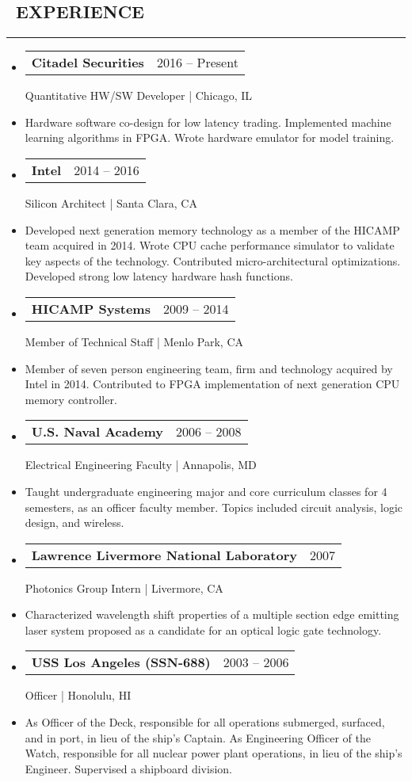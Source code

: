 \documentclass[10pt,letterpaper]{article}
\makeatletter
\newenvironment{resumesection}[1]
{%
    \subsection*{\ \textcolor{light-gray}{#1} }
    \vspace{-0.4em}
    \begin{samepage}
    \hrule
    \end{samepage}
    \vspace{+0.4em}
    \begin{itemize}[leftmargin=0.15cm]
        \parskip=0.1em
}%
{%
    \end{itemize}
}%
\newcommand{\myitem}[1] {
    \item[] \textcolor{dark-gray}{#1}
}
\newcommand{\headertri}[3] {
    \item[] \begin{tabular*}{\linewidth}{l@{\extracolsep{\fill}}r}
    \textbf{#1} & #2 \\
    \end{tabular*}
    #3
}
\newcommand{\cminiw}{0.075}
\newcommand{\rminiw}{0.550}
\makeatother
\begin{document}
\begin{minipage}[t]{\cminiw\textwidth}
\end{minipage}\hfill
\begin{minipage}[t]{\rminiw\textwidth}
\begin{resumesection}{EXPERIENCE}
    \headertri
    {Citadel Securities}
    {2016 -- Present}
    {Quantitative HW/SW Developer | Chicago, IL}
    \myitem{
        Hardware software co-design for low latency trading.
        Implemented machine learning algorithms in FPGA.
        Wrote hardware emulator for model training.
    }

    \headertri
    {Intel}
    {2014 -- 2016}
    {Silicon Architect | Santa Clara, CA}
    \myitem{
        Developed next generation memory technology as a member of the HICAMP team acquired in 2014.
        Wrote CPU cache performance simulator to validate key aspects of the technology.
        Contributed micro-architectural optimizations.
        Developed strong low latency hardware hash functions.
    }


    \headertri
    {HICAMP Systems}
    {2009 -- 2014}
    {Member of Technical Staff | Menlo Park, CA}
    \myitem{
        Member of seven person engineering team, firm and technology acquired by Intel in 2014.
        Contributed to FPGA implementation of next generation CPU memory controller.
    }

    \headertri
    {U.S. Naval Academy}
    {2006 -- 2008}
    {Electrical Engineering Faculty | Annapolis, MD}
    \myitem{
        Taught undergraduate engineering major and core curriculum classes for 4 semesters,
        as an officer faculty member.
        Topics included circuit analysis, logic design, and wireless.
    }

    \headertri
    {Lawrence Livermore National Laboratory}
    {2007}
    {Photonics Group Intern | Livermore, CA}
    \myitem{
        Characterized wavelength shift properties of a multiple section edge emitting laser system
        proposed as a candidate for an optical logic gate technology.
    }

    \headertri
    {USS Los Angeles (SSN-688)}
    {2003 -- 2006}
    {Officer | Honolulu, HI}
    \myitem{As Officer of the Deck, responsible for all operations submerged, surfaced, and in port, in lieu of the ship's Captain.
            As Engineering Officer of the Watch, responsible for all nuclear power plant operations, in lieu of the ship's Engineer.
            Supervised a shipboard division.}


\end{resumesection}
\end{minipage}
\end{document}
